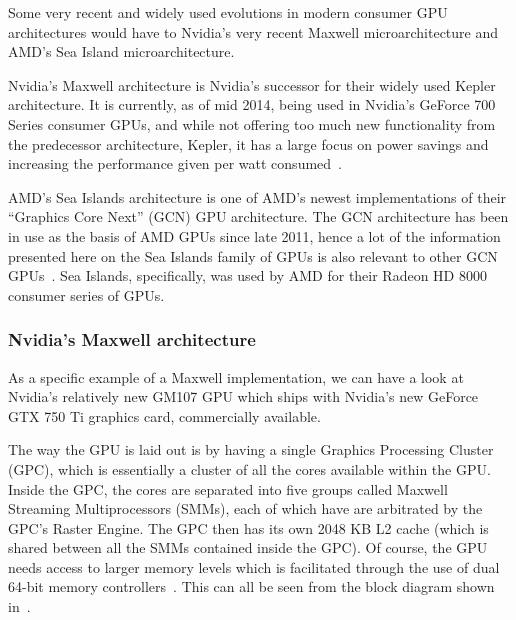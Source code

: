 \documentclass[a4paper,11pt]{article}
\begin{document}
Some very recent and widely used evolutions in modern consumer GPU architectures would have to Nvidia's very recent Maxwell
microarchitecture and AMD's Sea Island microarchitecture.

Nvidia's Maxwell architecture is Nvidia's successor for their widely used Kepler architecture. It is currently, as of
mid 2014, being used in Nvidia's GeForce 700 Series consumer GPUs, and while not offering too much new functionality
from the predecessor architecture, Kepler, it has a large focus on power savings and increasing the performance given
per watt consumed~\cite{whitepaper:NvidiaMaxwell}.

AMD's Sea Islands architecture is one of AMD's newest implementations of their ``Graphics Core Next'' (GCN) GPU
architecture. The GCN architecture has been in use as the basis of AMD GPUs since late 2011, hence a lot of the information
presented here on the Sea Islands family of GPUs is also relevant to other GCN GPUs~\cite{web:AnandGCNPreview}. Sea Islands,
specifically, was used by AMD for their Radeon HD 8000 consumer series of GPUs.

\subsubsection{Nvidia's Maxwell architecture} %
\label{ssub:nvidia_maxwell_architecture}
As a specific example of a Maxwell implementation, we can have a look at Nvidia's relatively new GM107 GPU which ships
with Nvidia's new GeForce GTX 750 Ti graphics card, commercially available.

The way the GPU is laid out is
by having a single Graphics Processing Cluster (GPC), which is essentially a cluster of all the cores available within the GPU.\@
Inside the GPC, the cores are separated into five groups called Maxwell Streaming Multiprocessors (SMMs), each of which have
are arbitrated by the GPC's Raster Engine. The GPC then has its own 2048 KB L2 cache (which is shared between all the SMMs
contained inside the GPC). Of course, the GPU needs access to larger memory levels which is facilitated through the use of dual
64-bit memory controllers~\cite{whitepaper:NvidiaMaxwell}. This can all be seen from the block diagram shown in~.
\end{document}
